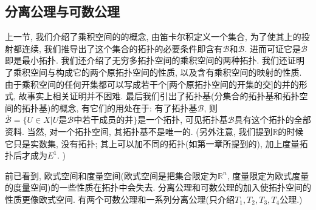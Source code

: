 \documentclass{ctexart}%
\theoremstyle{definition}
\theoremstyle{remark}
\begin{document}
\subsection{分离公理与可数公理}

上一节, 我们介绍了乘积空间的的概念, 由笛卡尔积定义一个集合, 为了使其上的投射都连续, 我们推导出了这个集合的拓扑的必要条件即含有$\mathscr{B}$和$\overline{\mathscr{B}}$. 进而可证它是$\overline{\mathscr{B}}$即是最小拓扑. 我们还介绍了无穷多拓扑空间的乘积空间的两种拓扑. 我们还证明了乘积空间与构成它的两个原拓扑空间的性质, 以及含有乘积空间的映射的性质. 由于乘积空间的任何开集都可以写成若干个[两个原拓扑空间的开集的交]的并的形式, 故事实上相关证明并不困难. 最后我们引出了拓扑基(分集合的拓扑基和拓扑空间的拓扑基)的概念, 有它们的用处在于: 有了拓扑基$\mathscr{B}$, 则$\overline{\mathscr{B}}=\{U\in X|U\text{是}\mathscr{B}\text{中若干成员的并}\}$是一个拓扑, 可见拓扑基$\mathscr{B}$具有这个拓扑的全部资料.  当然, 对一个拓扑空间, 其拓扑基不是唯一的. (另外注意, 我们提到$\mathbb{R}$的时候它只是实数集, 没有拓扑; 其上可以加不同的拓扑(如第一章所提到的), 加上度量拓扑后才成为$E^1$. )

前已看到, 欧式空间和度量空间(欧式空间是把集合限定为$\mathbb{R}^n$, 度量限定为欧式度量的度量空间)的一些性质在拓扑中会失去. 分离公理和可数公理的加入使拓扑空间的性质更像欧式空间. 有两个可数公理和一系列分离公理(只介绍$T_1,T_2,T_3,T_4$公理.)
\end{document}
